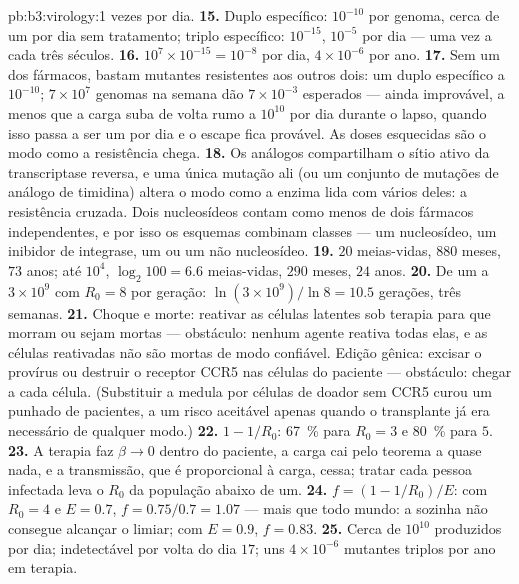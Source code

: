 \begin{solution}{pb:b3:virology:1}
vezes por dia.
\textbf{15.} Duplo específico: $10^{-10}$ por genoma, cerca de um por
dia sem tratamento; triplo específico: $10^{-15}$, $10^{-5}$ por dia ---
uma vez a cada três séculos.
\textbf{16.} $10^{7}\times 10^{-15} = 10^{-8}$ por dia,
$4\times 10^{-6}$ por ano.
\textbf{17.} Sem um dos fármacos, bastam mutantes resistentes aos
outros dois: um duplo específico a $10^{-10}$; $7\times 10^{7}$ genomas
na semana dão $7\times 10^{-3}$ esperados --- ainda improvável, a menos
que a carga suba de volta rumo a $10^{10}$ por dia durante o lapso,
quando isso passa a ser um por dia e o escape fica provável. As doses
esquecidas são o modo como a resistência chega.
\textbf{18.} Os análogos compartilham o sítio ativo da transcriptase
reversa, e uma única mutação ali (ou um conjunto de mutações de análogo
de timidina) altera o modo como a enzima lida com vários deles: a
resistência cruzada. Dois nucleosídeos contam como menos de dois
fármacos independentes, e por isso os esquemas combinam classes --- um
nucleosídeo, um inibidor de integrase, um  ou um não
nucleosídeo.
\textbf{19.} $20$ meias-vidas, $880$ meses, $73$ anos; até $10^{4}$,
$\log_{2}100 = 6.6$ meias-vidas, $290$ meses, $24$ anos.
\textbf{20.} De um  a $3\times 10^{9}$ com $R_{0} = 8$ por
geração: $\ln(3\times 10^{9})/\ln 8 = 10.5$ gerações, três semanas.
\textbf{21.} Choque e morte: reativar as células latentes sob terapia
para que morram ou sejam mortas --- obstáculo: nenhum agente reativa
todas elas, e as células reativadas não são mortas de modo confiável.
Edição gênica: excisar o provírus ou destruir o receptor CCR5 nas
células do paciente --- obstáculo: chegar a cada célula. (Substituir a
medula por células de doador sem CCR5 curou um punhado de pacientes, a
um risco aceitável apenas quando o transplante já era necessário de
qualquer modo.)
\textbf{22.} $1 - 1/R_{0}$: \qty{67}{\%} para $R_{0} = 3$ e
\qty{80}{\%} para $5$.
\textbf{23.} A terapia faz $\beta \to 0$ dentro do paciente, a carga cai
pelo teorema a quase nada, e a transmissão, que é proporcional à carga,
cessa; tratar cada pessoa infectada leva o $R_{0}$ da população abaixo
de um.
\textbf{24.} $f = (1 - 1/R_{0})/E$: com $R_{0} = 4$ e $E = 0.7$,
$f =
0.75/0.7 = 1.07$ --- mais que todo mundo: a  sozinha não
consegue alcançar o limiar; com $E = 0.9$, $f = 0.83$.
\textbf{25.} Cerca de $10^{10}$  produzidos por dia;
indetectável por volta do dia $17$; uns $4\times 10^{-6}$ mutantes
triplos por ano em terapia.
\end{solution}
